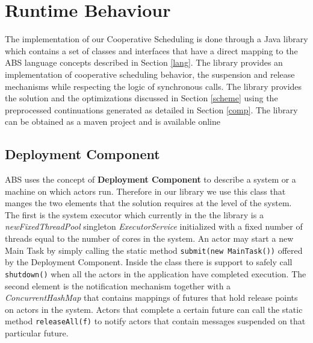 \section{Runtime Behaviour}
\label{run}
The implementation of our Cooperative Scheduling is done through a Java library which contains a set of classes and interfaces that have a direct mapping to the ABS language concepts described in Section \ref{lang}. The library provides an implementation of cooperative scheduling behavior, the suspension and release mechanisms while respecting the logic of synchronous calls. The library provides the solution and the optimizations discussed in Section \ref{scheme} using the preprocessed continuations generated as detailed in Section \ref{comp}. The library can be obtained as a maven project and is available online\cite{library}

\subsection{Deployment Component}
ABS uses the concept of \textbf{Deployment Component} to describe a system or a machine on which actors run. Therefore in our library we use this class that manges the two elements that the solution requires at the level of the system. The first is the system executor which currently in the the library is a \textit{newFixedThreadPool} singleton \textit{ExecutorService} initialized with a fixed number of threads equal to the number of cores in the system. An actor may start a new Main Task by simply calling the static method \lstinline|submit(new MainTask())| offered by the Deployment Component. Inside the class there is support to safely call \lstinline|shutdown()| when all the actors in the application have completed execution. The second element is the notification mechanism together with a \textit{ConcurrentHashMap} that contains mappings of futures that hold release points on actors in the system. Actors that complete a certain future can call the static method \lstinline|releaseAll(f)| to notify actors that contain messages suspended on that particular future. 




